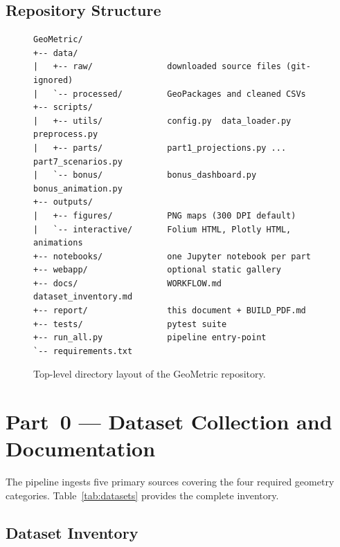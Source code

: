 \documentclass[12pt, a4paper, oneside]{report}
\begin{document}
\section{Repository Structure}

\begin{figure}[H]
  \centering
  \begin{BVerbatim}[fontsize=\small]
GeoMetric/
+-- data/
|   +-- raw/               downloaded source files (git-ignored)
|   `-- processed/         GeoPackages and cleaned CSVs
+-- scripts/
|   +-- utils/             config.py  data_loader.py  preprocess.py
|   +-- parts/             part1_projections.py ... part7_scenarios.py
|   `-- bonus/             bonus_dashboard.py  bonus_animation.py
+-- outputs/
|   +-- figures/           PNG maps (300 DPI default)
|   `-- interactive/       Folium HTML, Plotly HTML, animations
+-- notebooks/             one Jupyter notebook per part
+-- webapp/                optional static gallery
+-- docs/                  WORKFLOW.md  dataset_inventory.md
+-- report/                this document + BUILD_PDF.md
+-- tests/                 pytest suite
+-- run_all.py             pipeline entry-point
`-- requirements.txt
  \end{BVerbatim}
  \caption{Top-level directory layout of the GeoMetric repository.}
  \label{fig:repolayout}
\end{figure}

\chapter{Part~0 --- Dataset Collection and Documentation}

The pipeline ingests five primary sources covering the four required geometry categories.
Table~\ref{tab:datasets} provides the complete inventory.

\section{Dataset Inventory}
\end{document}

